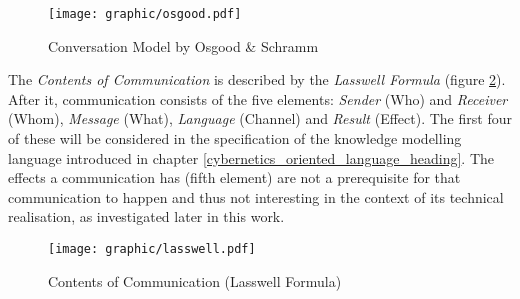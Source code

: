 \begin{figure}[ht]
    \begin{center}
        \texttt{[image: graphic/osgood.pdf]}
        \caption{Conversation Model by Osgood \& Schramm \cite{osgood}}
        \label{osgood_figure}
    \end{center}
\end{figure}

The \emph{Contents of Communication} is described by the
\emph{Lasswell Formula} (figure \ref{lasswell_figure}). After it, communication
consists of the five elements: \emph{Sender} (Who) and \emph{Receiver} (Whom),
\emph{Message} (What), \emph{Language} (Channel) and \emph{Result} (Effect).
The first four of these will be considered in the specification of the
knowledge modelling language introduced in chapter
\ref{cybernetics_oriented_language_heading}. The effects a communication has
(fifth element) are not a prerequisite for that communication to happen and
thus not interesting in the context of its technical realisation, as
investigated later in this work.

\begin{figure}[ht]
    \begin{center}
        \texttt{[image: graphic/lasswell.pdf]}
        \caption{Contents of Communication (Lasswell Formula) \cite{lasswell}}
        \label{lasswell_figure}
    \end{center}
\end{figure}
